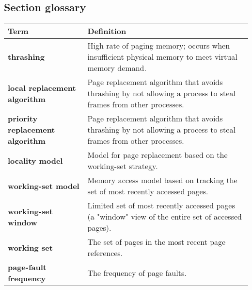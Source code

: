 \subsection*{Section glossary}
\begin{tabular}{p{}p{}}
    \toprule
    \rowcolor{gray!20} \textbf{Term} & \textbf{Definition} \\
    \midrule
    \textbf{thrashing} & High rate of paging memory; occurs when insufficient physical memory to meet virtual memory demand. \\
    \textbf{local replacement algorithm} & Page replacement algorithm that avoids thrashing by not allowing a process to steal frames from other processes. \\
    \textbf{priority replacement algorithm} & Page replacement algorithm that avoids thrashing by not allowing a process to steal frames from other processes. \\
    \textbf{locality model} & Model for page replacement based on the working-set strategy. \\
    \textbf{working-set model} & Memory access model based on tracking the set of most recently accessed pages. \\
    \textbf{working-set window} & Limited set of most recently accessed pages (a "window" view of the entire set of accessed pages). \\
    \textbf{working set} & The set of pages in the most recent page references. \\
    \textbf{page-fault frequency} & The frequency of page faults. \\
    \bottomrule
\end{tabular}
